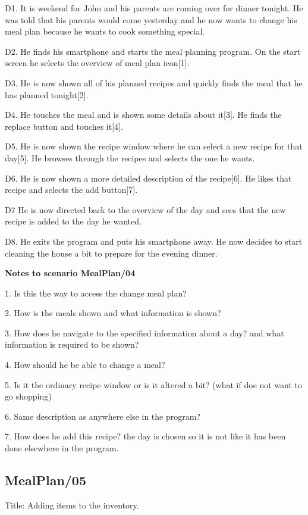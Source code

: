 	D1. It is weekend for John and his parents are coming over for dinner tonight. He was told that his parents would come yesterday and he now wants to change his meal plan because he wants to cook something special.
	
	D2. He finds his smartphone and starts the meal planning program. On the start screen he selects the overview of meal plan icon[1].
	
	D3. He is now shown all of his planned recipes and quickly finds the meal that he has planned tonight[2].
	
	D4. He touches the meal and is shown some details about it[3]. He finds the replace button and touches it[4].
	
	D5. He is now shown the recipe window where he can select a new recipe for that day[5]. He browses through the recipes and selects the one he wants. 

	D6. He is now shown a more detailed description of the recipe[6]. He likes that recipe and selects the add button[7].

	D7 He is now directed back to the overview of the day and sees that the new recipe is added to the day he wanted.
	
	D8. He exits the program and puts his smartphone away. He now decides to start cleaning the house a bit to prepare for the evening dinner.
	
\textbf{Notes to scenario MealPlan/04}

1. Is this the way to access the change meal plan?

2. How is the meals shown and what information is shown? 

3. How does he navigate to the specified information about a day? and what information is required to be shown?

4. How should he be able to change a meal?

5. Is it the ordinary recipe window or is it altered a bit? (what if doe not want to go shopping) 

6. Same description as anywhere else in the program?

7. How does he add this recipe? the day is chosen so it is not like it has been done elsewhere in the program.

\subsection{MealPlan/05} \label{MealPlan05}

Title: Adding items to the inventory.

